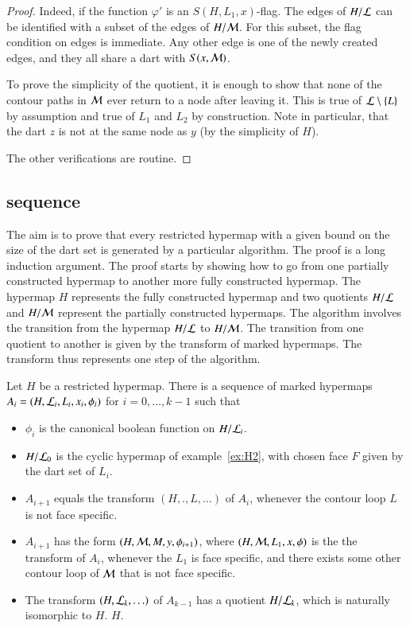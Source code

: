 \begin{proof}
   Indeed, if the
function $\varphi'$ is an $S(H,L_1,x)$-flag.  The edges of $H/{\cal
L}$ can be identified with a subset of the edges of $H/{\cal M}$.
For this subset, the flag condition on edges is immediate.  Any
other edge is one of the newly created edges, and they all share a
dart with $S(x,{\cal M})$.

 To prove the simplicity of the quotient, it is enough to show that
none of the contour
paths in ${\cal M}$  ever return to a node after leaving it.
This is true of ${\cal L}\setminus\{L\}$ by assumption and true of
$L_1$ and $L_2$ by construction.  Note in particular, that the dart
$z$ is not at the same node as $y$ (by the simplicity of $H$).

The other verifications are routine.
\end{proof}

\subsection{sequence}

The aim is to prove that every restricted hypermap with a given bound
on the size of the dart set is generated by a particular algorithm.
The proof is a long induction argument.  The proof starts by showing
how to go from one partially constructed hypermap to another more
fully constructed hypermap.  The hypermap $H$ represents the fully
constructed hypermap and two quotients $H/{\cal L}$ and $H/{\cal M}$
represent the partially constructed hypermaps.  The algorithm involves
the transition from the hypermap $H/{\cal L}$ to $H/{\cal M}$.  The
transition from one quotient to another is given by the transform of
marked hypermaps.  The transform thus represents one step of the
algorithm.  %

\begin{lemma}  Let $H$ be a restricted hypermap.  
There is a sequence of marked hypermaps
$A_i = (H,{\cal L}_i,L_i,x_i,\phi_i)$ for $i=0,\ldots,k-1$ such that
\begin{itemize}
\item $\phi_i$ is the canonical boolean function on $H/{\cal L}_i$.
\item $H/{\cal L}_0$ is the cyclic hypermap of example~\ref{ex:H2}, with
chosen face $F$ given by the dart set of $L_i$.
\item $A_{i+1}$ equals the transform $(H,.,L,\ldots)$ of
$A_i$, whenever the contour loop $L$ is not face specific.
\item $A_{i+1}$ has the form $(H,{\cal M},M,y,\phi_{i+1})$, where $(H,{\cal M},L_1,x,\phi)$ is
the the transform of $A_i$, whenever the $L_1$ is face specific, and there exists some other contour loop of ${\cal M}$ that is not face specific.
\item The transform $(H,{\cal L}_k,\ldots)$ of $A_{k-1}$ has a quotient $H/{\cal L}_k$,
which is naturally isomorphic to $H$.  
  $H$.
\end{itemize}
\end{lemma}

